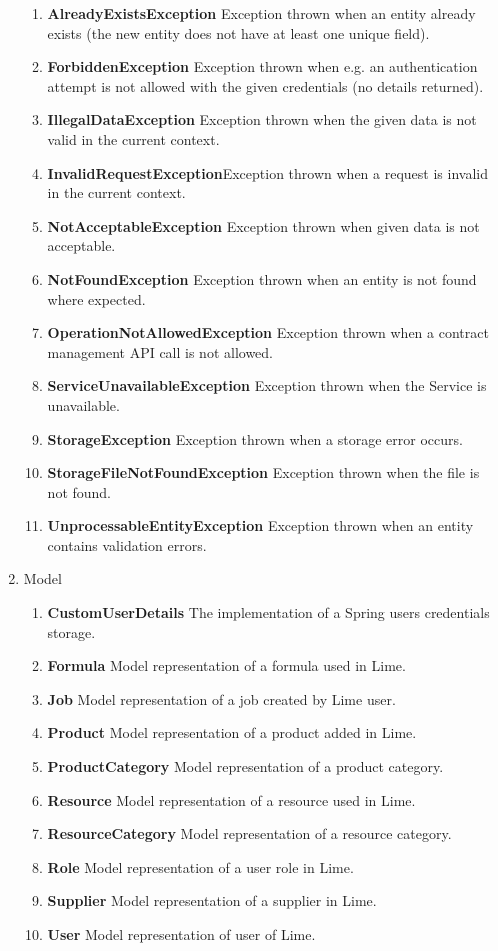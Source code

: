 \documentclass[a4paper,11pt,twoside]{report}
\theoremstyle{definition}
\begin{document}
\begin{enumerate}
\begin{enumerate}
\item \textbf{AlreadyExistsException} Exception thrown when an entity already exists (the new entity does not have at least one unique field).
\item \textbf{ForbiddenException} Exception thrown when e.g. an authentication attempt is not allowed with the given credentials (no details returned).
\item \textbf{IllegalDataException} Exception thrown when the given data is not valid in the current context.
\item \textbf{InvalidRequestException}Exception thrown when a request is invalid in the current context.
\item \textbf{NotAcceptableException} Exception thrown when given data is not acceptable.
\item \textbf{NotFoundException} Exception thrown when an entity is not found where expected.
\item \textbf{OperationNotAllowedException} Exception thrown when a contract management API call is not allowed.
\item \textbf{ServiceUnavailableException} Exception thrown when the Service is unavailable.
\item \textbf{StorageException} Exception thrown when a storage error occurs.

\item \textbf{StorageFileNotFoundException} Exception thrown when the file is not found.
\item \textbf{UnprocessableEntityException} Exception thrown when an entity contains validation errors.

\end{enumerate} 
\item Model 
\begin{enumerate}
 
\item \textbf{CustomUserDetails} The implementation of a Spring users credentials storage.
\item \textbf{Formula} Model representation of a formula used in Lime.
\item \textbf{Job} Model representation of a job created by Lime user.
\item \textbf{Product} Model representation of a product added in Lime.
\item \textbf{ProductCategory} Model representation of a product category.
\item \textbf{Resource} Model representation of a resource used in Lime.
\item \textbf{ResourceCategory} Model representation of a resource category.
\item \textbf{Role} Model representation of a user role in Lime.
\item \textbf{Supplier} Model representation of a supplier in Lime.
\item \textbf{User} Model representation of user of Lime.


\end{enumerate}
\end{enumerate}
\end{document}
